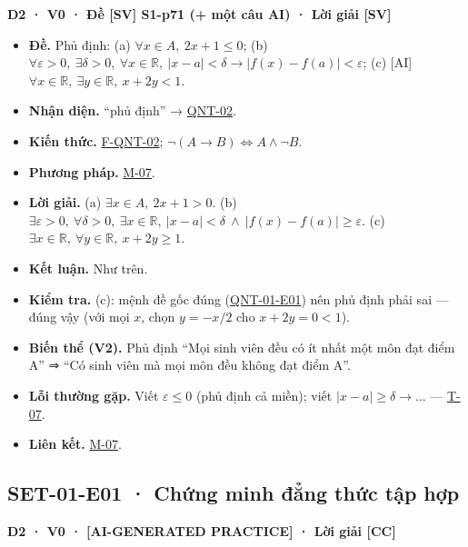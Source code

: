 \documentclass[
  10pt,
  twoside,openany]{book}
\providecommand{\tightlist}{%
  \setlength{\itemsep}{0pt}\setlength{\parskip}{0pt}}
\begin{document}
\textbf{D2 · V0 · Đề {[}SV{]} S1-p71 (+ một câu AI) · Lời giải {[}SV{]}}

\begin{itemize}
\tightlist
\item
  \textbf{Đề.} Phủ định: (a) \(\forall x\in A,\ 2x+1\le0\); (b)
  \(\forall\varepsilon>0,\ \exists\delta>0,\ \forall x\in\mathbb R,\ |x-a|<\delta\to|f(x)-f(a)|<\varepsilon\);
  (c) {[}AI{]}
  \(\forall x\in\mathbb R,\ \exists y\in\mathbb R,\ x+2y<1\).
\item
  \textbf{Nhận diện.} ``phủ định'' → \protect\hyperlink{QNT-02}{QNT-02}.
\item
  \textbf{Kiến thức.} \protect\hyperlink{F-QNT-02}{F-QNT-02};
  \(\neg(A\to B)\Leftrightarrow A\wedge\neg B\).
\item
  \textbf{Phương pháp.} \protect\hyperlink{M-07}{M-07}.
\item
  \textbf{Lời giải.} (a) \(\exists x\in A,\ 2x+1>0\). (b)
  \(\exists\varepsilon>0,\ \forall\delta>0,\ \exists x\in\mathbb R,\ |x-a|<\delta\ \wedge\ |f(x)-f(a)|\ge\varepsilon\).
  (c) \(\exists x\in\mathbb R,\ \forall y\in\mathbb R,\ x+2y\ge1\).
\item
  \textbf{Kết luận.} Như trên.
\item
  \textbf{Kiểm tra.} (c): mệnh đề gốc đúng
  (\protect\hyperlink{QNT-01-E01}{QNT-01-E01}) nên phủ định phải sai ---
  đúng vậy (với mọi \(x\), chọn \(y=-x/2\) cho \(x+2y=0<1\)).
\item
  \textbf{Biến thể (V2).} Phủ định ``Mọi sinh viên đều có ít nhất một
  môn đạt điểm A'' ⇒ ``Có sinh viên mà mọi môn đều không đạt điểm A''.
\item
  \textbf{Lỗi thường gặp.} Viết \(\varepsilon\le0\) (phủ định cả miền);
  viết \(|x-a|\ge\delta\to\dots\) --- \protect\hyperlink{T-07}{T-07}.
\item
  \textbf{Liên kết.} \protect\hyperlink{M-07}{M-07}.
\end{itemize}

\hypertarget{SET-01-E01}{%
\subsection{SET-01-E01 · Chứng minh đẳng thức tập
hợp}\label{SET-01-E01}}

\textbf{D2 · V0 · {[}AI-GENERATED PRACTICE{]} · Lời giải {[}CC{]}}
\end{document}
